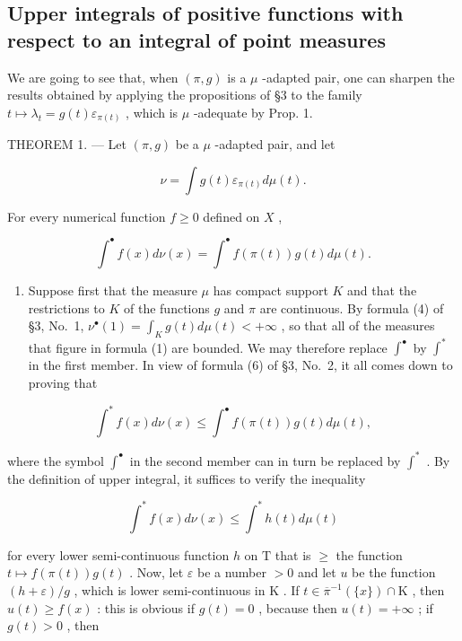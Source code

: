 \subsection{Upper integrals of positive functions with respect to an integral of point measures}

We are going to see that, when \((\pi,g)\) is a \(\mu\) -adapted pair, one can sharpen the results obtained by applying the propositions of §3 to the family \(t\mapsto\lambda_{t}=g(t)\varepsilon_{\pi(t)}\) , which is \(\mu\) -adequate by Prop. 1.

THEOREM 1. --- Let \((\pi, g)\) be a \(\mu\) -adapted pair, and let

\[
\nu = \int g (t) \varepsilon_ {\pi (t)} d \mu (t).
\]

For every numerical function \(f \geqslant 0\) defined on \(X\) ,

\[
\int^ {\bullet} f (x) d \nu (x) = \int^ {\bullet} f (\pi (t)) g (t) d \mu (t).\tag{1}
\]

\begin{enumerate}
\def\labelenumi{\Alph{enumi})}
\tightlist
\item
  Suppose first that the measure \(\mu\) has compact support \(K\) and that the restrictions to \(K\) of the functions \(g\) and \(\pi\) are continuous. By formula (4) of §3, No.~1, \(\nu^{\bullet}(1) = \int_{K} g(t) d\mu(t) < +\infty\) , so that all of the measures that figure in formula (1) are bounded. We may therefore replace \(\int^{\bullet}\) by \(\int^{*}\) in the first member. In view of formula (6) of §3, No.~2, it all comes down to proving that
\end{enumerate}

\[
\int^ {*} f (x) d \nu (x) \leqslant \int^ {\bullet} f (\pi (t)) g (t) d \mu (t),\tag{2}
\]

where the symbol \(\int^{\bullet}\) in the second member can in turn be replaced by \(\int^{*}\) . By the definition of upper integral, it suffices to verify the inequality

\[
\int^ {*} f (x) d \nu (x) \leqslant \int^ {*} h (t) d \mu (t)\tag{3}
\]

for every lower semi-continuous function \(h\) on \(\mathrm{T}\) that is \(\geqslant\) the function \(t \mapsto f(\pi(t))g(t)\) . Now, let \(\varepsilon\) be a number \(> 0\) and let \(u\) be the function \((h + \varepsilon)/g\) , which is lower semi-continuous in \(\mathrm{K}\) . If \(t \in \overline{\pi}^{-1}(\{x\}) \cap \mathrm{K}\) , then \(u(t) \geqslant f(x)\) : this is obvious if \(g(t) = 0\) , because then \(u(t) = +\infty\) ; if \(g(t) > 0\) , then

